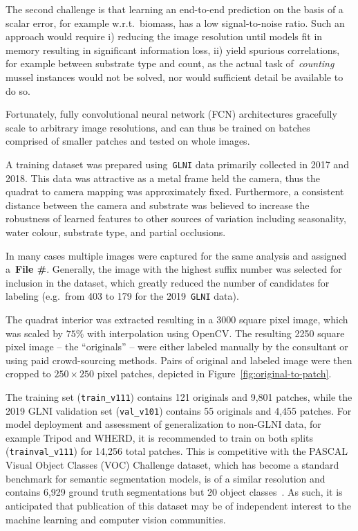 \documentclass[11pt]{article} %
\begin{document}
The second challenge is that learning an end-to-end prediction on the basis of 
a scalar error, for example w.r.t.~biomass, has a low signal-to-noise 
ratio. Such an approach would require i) reducing the image resolution until
models fit in memory resulting in significant information loss, ii) yield
spurious correlations, for example between substrate type and count, as 
the actual task of~\emph{counting} mussel instances would not be solved, 
nor would sufficient detail be available to do so.

Fortunately, fully convolutional neural network (FCN) architectures gracefully 
scale to arbitrary image resolutions, and can thus be trained on batches 
comprised of smaller patches and tested on whole images. 

A training dataset was prepared using~\texttt{GLNI} data primarily collected in 
2017 and 2018. This data was attractive as a metal frame held the camera, thus
the quadrat to camera mapping was approximately fixed. Furthermore, a
consistent distance between the camera and substrate was believed to increase
the robustness of learned features to other sources of variation including 
seasonality, water colour, substrate type, and partial occlusions.

In many cases multiple images were captured for the same analysis and assigned 
a~\textbf{File \#}. Generally, the image with the highest suffix number was 
selected for inclusion in the dataset, which greatly reduced the number 
of candidates for labeling (e.g.~from 403 to 179 for the 
2019~\texttt{GLNI} data). 

The quadrat interior was extracted resulting in a 3000 square pixel image,  
which was scaled by $75\%$ with interpolation using OpenCV. The resulting 2250
square pixel image -- the ``originals'' -- were either labeled manually by the 
consultant or using paid crowd-sourcing methods. Pairs of original and labeled
image were then cropped to $250 \times 250$ pixel patches, depicted in
Figure~\ref{fig:original-to-patch}. 

The training set (\texttt{train\_v111}) contains 121 originals and 9,801 
patches, while the 2019 GLNI validation set (\texttt{val\_v101}) contains 55 
originals and 4,455 patches. For model deployment and assessment of 
generalization to non-GLNI data, for example Tripod and WHERD, it is 
recommended to train on both splits (\texttt{trainval\_v111}) for 14,256 total 
patches. 
This is competitive with the PASCAL Visual Object Classes (VOC) Challenge 
dataset, which has become a standard benchmark for semantic segmentation 
models, is of a similar resolution and contains 6,929 ground truth 
segmentations but 20 object classes~\citep{everingham2015pascal}. As such, it
is anticipated that publication of this dataset may be of independent interest 
to the machine learning and computer vision communities.
\end{document}
